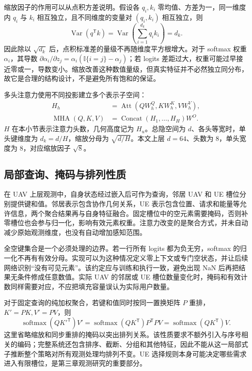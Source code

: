 缩放因子的作用可以从点积方差说明。假设各 $q_i,k_i$ 零均值、方差为一，同一维度内 $q_i$ 与 $k_i$ 相互独立，且不同维度的变量对 $(q_i,k_i)$ 相互独立，则
\begin{equation}
    \operatorname{Var}(q^{\mathsf T}k)
    =\operatorname{Var}\left(\sum_{i=1}^{d_k}q_i k_i\right)=d_k.
    \label{eq:ch2-attention-variance}
\end{equation}
因此除以 $\sqrt{d_k}$ 后，点积标准差的量级不再随维度平方根增大。对于 softmax 权重 $\alpha_i$，其导数 $\partial\alpha_i/\partial z_j=\alpha_i(\mathbb I\{i=j\}-\alpha_j)$；若 logits 差距过大，权重可能过早接近零或一，导数变小。缩放改善这种数值量级，但真实特征并不必然独立同分布，故它是合理的结构设计，不是避免所有饱和的保证。

多头注意力使用不同投影建立多个表示子空间：
\begin{align}
    H_h&=\operatorname{Att}(QW_h^Q,KW_h^K,VW_h^V),\\
    \operatorname{MHA}(Q,K,V)&=\operatorname{Concat}(H_1,\ldots,H_H)W^O.
    \label{eq:ch2-multihead}
\end{align}
$H$ 在本小节表示注意力头数，几何高度记为 $H_u$。总隐空间为 $d$、各头等宽时，单头键维度为 $d_k=d/H$，缩放分母为 $\sqrt{d/H}$。本文上层 $d=64$、头数为 $8$，单头宽度为 $8$，对应缩放因子 $\sqrt8$。

\subsection{局部查询、掩码与排列性质}
\label{sec:ch2-cross-attention}

在 UAV 上层观测中，自身状态经过嵌入后可作为查询，邻居 UAV 和 UE 槽位分别提供键和值。邻居表示包含协作几何关系，UE 表示包含位置、请求和能量等允许信息，两个聚合结果再与自身特征融合。固定槽位中的空元素需要掩码，否则补零槽位也会参与归一化，影响有效元素权重。注意力改变的是聚合方式，并未自动减少原始观测维度，也没有自动增加感知范围。

全空键集合是一个必须处理的边界。若一行所有 logits 都为负无穷，softmax 的归一化不再有有效分母。实现可以为这种情况定义零上下文或专门空状态，并让后续网络识别“没有可见元素”。该约定应与训练和执行一致，避免出现 NaN 后再把结果无条件修成任意数值。实际 UAV 的邻居或 UE 槽位数量变化时，掩码和有效计数同样需要对应，不应把填充容量误认为实际用户数量。

对于固定查询的纯加权聚合，若键和值同时按同一置换矩阵 $P$ 重排，$K'=PK,V'=PV$，则
\begin{equation}
    \operatorname{softmax}(QK'^{\mathsf T})V'
    =\operatorname{softmax}(QK^{\mathsf T})P^{\mathsf T}PV
    =\operatorname{softmax}(QK^{\mathsf T})V.
    \label{eq:ch2-permutation-invariance}
\end{equation}
这里省略缩放和同步重排的掩码以突出排列关系。该性质要求不额外引入与序号相关的编码；完整系统还包含排序、截断、分组和其他特征，因此不能从这一局部式子推断整个策略对所有观测处理均排列不变。UE 选择规则本身可能决定哪些需求进入有限槽位，是第三章观测研究的重要部分。

